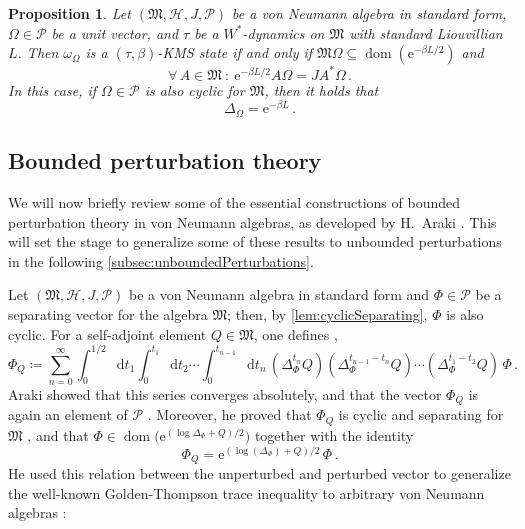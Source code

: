 \documentclass[a4paper, twoside, 11pt, reqno]{amsart}
\theoremstyle{definition}
\theoremstyle{plain}
\newtheorem{proposition}[definition]{Proposition}
\renewcommand{\subset}{\subseteq}
\renewcommand{\Delta}{\varDelta}
\renewcommand{\Phi}{\varPhi}
\renewcommand{\Omega}{\varOmega}
\newcommand{\MH}{\mathcal{H}}
\newcommand{\MFM}{\mathfrak{M}}
\newcommand{\ee}{\mathrm{e}}
\newcommand{\NPC}{\mathcal{P}}
\newcommand{\1}{\mathbf{1}}
\newcommand{\diff}{\mathop{}\!\mathrm{d}}
\DeclareMathOperator{\dom}{dom}
\newcommand{\ce}{\coloneqq}
\begin{document}
\begin{proposition}\label{pro:LiouvillianKMS}
    Let $(\MFM, \MH, J, \NPC)$ be a von Neumann algebra in standard form, $\Omega \in \NPC$ be a unit vector, and $\tau$ be a $W^\ast$-dynamics on $\MFM$ with standard Liouvillian $L$. Then $\omega_\Omega$ is a $(\tau, \beta)$-KMS state if and only if $\MFM \Omega \subset \dom(\ee^{- \beta L / 2})$ and
    \begin{equation*}
        \forall \, A \in \MFM \ : \ \ee^{- \beta L / 2} A \Omega = J A^\ast \Omega \, .
    \end{equation*}
    In this case, if $\Omega \in \NPC$ is also cyclic for $\MFM$, then it holds that
    \begin{equation*}
        \Delta_\Omega = \ee^{- \beta L} \, .
    \end{equation*}
\end{proposition}


\subsection{Bounded perturbation theory}\label{subsec:boundedPerturbations}

We will now briefly review some of the essential constructions of bounded perturbation theory in von Neumann algebras, as developed by H.~Araki \cite{Araki1973a, Araki1973b, Araki1973c}. This will set the stage to generalize some of these results to unbounded perturbations in the following \cref{subsec:unboundedPerturbations}.

Let $(\MFM, \MH, J, \NPC)$ be a von Neumann algebra in standard form and $\Phi \in \NPC$ be a separating vector for the algebra $\MFM$; then, by \cref{lem:cyclicSeparating}, $\Phi$ is also cyclic. For a self-adjoint element $Q \in \MFM$, one defines \cite[Eq. (1.1)]{Araki1973b}, \cite[Eq. (4.18)]{Araki1973c}
\begin{equation*}
    \Phi_Q \ce \sum_{n=0}^{\infty} \int_{0}^{1/2} \diff t_1 \int_{0}^{t_1} \diff t_2 \dotsb \int_{0}^{t_{n-1}} \diff t_n \, (\Delta_\Phi^{t_n} Q) (\Delta_\Phi^{t_{n-1}-t_n} Q) \dotsm (\Delta_\Phi^{t_1-t_2} Q) \, \Phi \, .
\end{equation*}
Araki showed that this series converges absolutely, and that the vector $\Phi_Q$ is again an element of $\NPC$ \cite[Prop. 4.1]{Araki1973c}. Moreover, he proved that $\Phi_Q$ is cyclic and separating for $\MFM$ \cite[Cor. 4.4]{Araki1973c}, and that $\Phi \in \dom \bigl(\ee^{(\log \Delta_\Phi + Q) / 2}\bigr)$ together with the identity \cite[Corollary on p. 170]{Araki1973b}
\begin{equation}\label{eq:boundedPerturbedVector}
    \Phi_Q = \ee^{(\log (\Delta_\Phi) + Q) / 2} \, \Phi \, .
\end{equation}
He used this relation between the unperturbed and perturbed vector to generalize the well-known Golden-Thompson trace inequality to arbitrary von Neumann algebras \cite[Thm. 2]{Araki1973b}:
\end{document}
